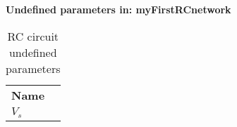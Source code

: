 {\textbf{Undefined parameters in: myFirstRCnetwork}}

\begin{table}[H]
\centering
\begin{tabular}[c]{l}
\textbf{Name} \\ 
\rowcolor{myyellow}
$V_{s}$ \\ 
\end{tabular}
\caption{RC circuit undefined parameters}
\end{table}

